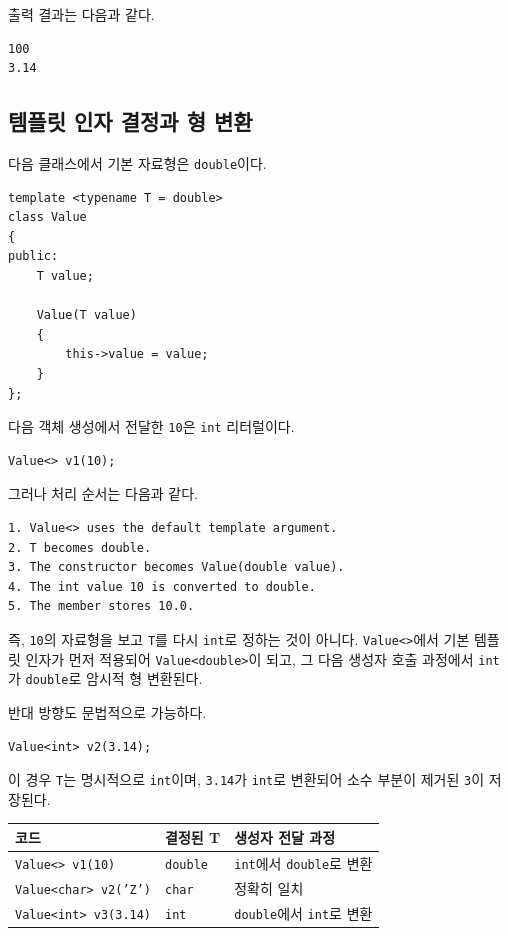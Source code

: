 \documentclass[11pt,a4paper]{article}
\begin{document}
출력 결과는 다음과 같다.

\begin{verbatim}
100
3.14
\end{verbatim}

\subsection{템플릿 인자 결정과 형 변환}
다음 클래스에서 기본 자료형은 \texttt{double}이다.

\begin{lstlisting}
template <typename T = double>
class Value
{
public:
    T value;

    Value(T value)
    {
        this->value = value;
    }
};
\end{lstlisting}

다음 객체 생성에서 전달한 \texttt{10}은 \texttt{int} 리터럴이다.

\begin{lstlisting}
Value<> v1(10);
\end{lstlisting}

그러나 처리 순서는 다음과 같다.

\begin{verbatim}
1. Value<> uses the default template argument.
2. T becomes double.
3. The constructor becomes Value(double value).
4. The int value 10 is converted to double.
5. The member stores 10.0.
\end{verbatim}

즉, \texttt{10}의 자료형을 보고 \texttt{T}를 다시 \texttt{int}로 정하는 것이 아니다. \texttt{Value<>}에서 기본 템플릿 인자가 먼저 적용되어 \texttt{Value<double>}이 되고, 그 다음 생성자 호출 과정에서 \texttt{int}가 \texttt{double}로 암시적 형 변환된다.

반대 방향도 문법적으로 가능하다.

\begin{lstlisting}
Value<int> v2(3.14);
\end{lstlisting}

이 경우 \texttt{T}는 명시적으로 \texttt{int}이며, \texttt{3.14}가 \texttt{int}로 변환되어 소수 부분이 제거된 \texttt{3}이 저장된다.

\begin{center}
\begin{tabular}{lll}
\toprule
코드 & 결정된 T & 생성자 전달 과정 \\
\midrule
\texttt{Value<> v1(10)} & \texttt{double} & \texttt{int}에서 \texttt{double}로 변환 \\
\texttt{Value<char> v2('Z')} & \texttt{char} & 정확히 일치 \\
\texttt{Value<int> v3(3.14)} & \texttt{int} & \texttt{double}에서 \texttt{int}로 변환 \\
\bottomrule
\end{tabular}
\end{center}
\end{document}

